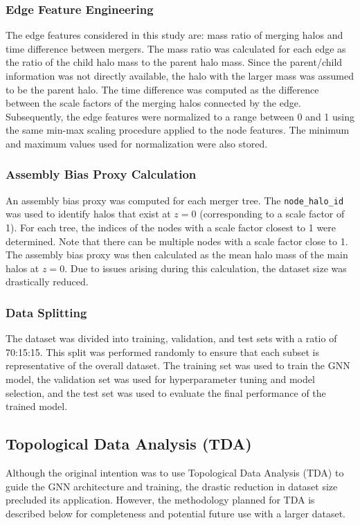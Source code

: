 \documentclass[twocolumn]{aastex631}
\begin{document}
\subsubsection{Edge Feature Engineering}
The edge features considered in this study are: mass ratio of merging halos and time difference between mergers. The mass ratio was calculated for each edge as the ratio of the child halo mass to the parent halo mass. Since the parent/child information was not directly available, the halo with the larger mass was assumed to be the parent halo. The time difference was computed as the difference between the scale factors of the merging halos connected by the edge. Subsequently, the edge features were normalized to a range between 0 and 1 using the same min-max scaling procedure applied to the node features. The minimum and maximum values used for normalization were also stored.

\subsubsection{Assembly Bias Proxy Calculation}
An assembly bias proxy was computed for each merger tree. The \texttt{node\_halo\_id} was used to identify halos that exist at $z=0$ (corresponding to a scale factor of 1). For each tree, the indices of the nodes with a scale factor closest to 1 were determined. Note that there can be multiple nodes with a scale factor close to 1. The assembly bias proxy was then calculated as the mean halo mass of the main halos at $z=0$. Due to issues arising during this calculation, the dataset size was drastically reduced.

\subsubsection{Data Splitting}
The dataset was divided into training, validation, and test sets with a ratio of 70:15:15. This split was performed randomly to ensure that each subset is representative of the overall dataset. The training set was used to train the GNN model, the validation set was used for hyperparameter tuning and model selection, and the test set was used to evaluate the final performance of the trained model.

\subsection{Topological Data Analysis (TDA)}

Although the original intention was to use Topological Data Analysis (TDA) to guide the GNN architecture and training, the drastic reduction in dataset size precluded its application. However, the methodology planned for TDA is described below for completeness and potential future use with a larger dataset.
\end{document}

